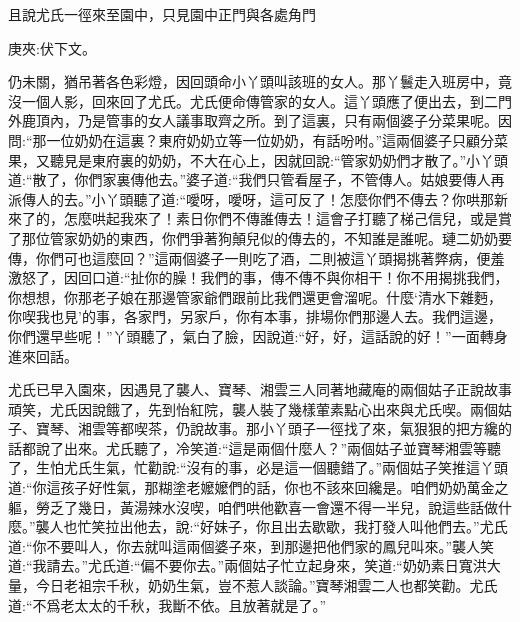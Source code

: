 \begin{parag}
    且說尤氏一徑來至園中，只見園中正門與各處角門\begin{note}庚夾:伏下文。\end{note}仍未關，猶吊著各色彩燈，因回頭命小丫頭叫該班的女人。那丫鬟走入班房中，竟沒一個人影，回來回了尤氏。尤氏便命傳管家的女人。這丫頭應了便出去，到二門外鹿頂內，乃是管事的女人議事取齊之所。到了這裏，只有兩個婆子分菜果呢。因問:“那一位奶奶在這裏？東府奶奶立等一位奶奶，有話吩咐。”這兩個婆子只顧分菜果，又聽見是東府裏的奶奶，不大在心上，因就回說:“管家奶奶們才散了。”小丫頭道:“散了，你們家裏傳他去。”婆子道:“我們只管看屋子，不管傳人。姑娘要傳人再派傳人的去。”小丫頭聽了道:“噯呀，噯呀，這可反了！怎麼你們不傳去？你哄那新來了的，怎麼哄起我來了！素日你們不傳誰傳去！這會子打聽了梯己信兒，或是賞了那位管家奶奶的東西，你們爭著狗顛兒似的傳去的，不知誰是誰呢。璉二奶奶要傳，你們可也這麼回？”這兩個婆子一則吃了酒，二則被這丫頭揭挑著弊病，便羞激怒了，因回口道:“扯你的臊！我們的事，傳不傳不與你相干！你不用揭挑我們，你想想，你那老子娘在那邊管家爺們跟前比我們還更會溜呢。什麼‘清水下雜麪，你喫我也見’的事，各家門，另家戶，你有本事，排場你們那邊人去。我們這邊，你們還早些呢！”丫頭聽了，氣白了臉，因說道:“好，好，這話說的好！”一面轉身進來回話。
\end{parag}


\begin{parag}
    尤氏已早入園來，因遇見了襲人、寶琴、湘雲三人同著地藏庵的兩個姑子正說故事頑笑，尤氏因說餓了，先到怡紅院，襲人裝了幾樣葷素點心出來與尤氏喫。兩個姑子、寶琴、湘雲等都喫茶，仍說故事。那小丫頭子一徑找了來，氣狠狠的把方纔的話都說了出來。尤氏聽了，冷笑道:“這是兩個什麼人？”兩個姑子並寶琴湘雲等聽了，生怕尤氏生氣，忙勸說:“沒有的事，必是這一個聽錯了。”兩個姑子笑推這丫頭道:“你這孩子好性氣，那糊塗老嬤嬤們的話，你也不該來回纔是。咱們奶奶萬金之軀，勞乏了幾日，黃湯辣水沒喫，咱們哄他歡喜一會還不得一半兒，說這些話做什麼。”襲人也忙笑拉出他去，說:“好妹子，你且出去歇歇，我打發人叫他們去。”尤氏道:“你不要叫人，你去就叫這兩個婆子來，到那邊把他們家的鳳兒叫來。”襲人笑道:“我請去。”尤氏道:“偏不要你去。”兩個姑子忙立起身來，笑道:“奶奶素日寬洪大量，今日老祖宗千秋，奶奶生氣，豈不惹人談論。”寶琴湘雲二人也都笑勸。尤氏道:“不爲老太太的千秋，我斷不依。且放著就是了。”
\end{parag}


